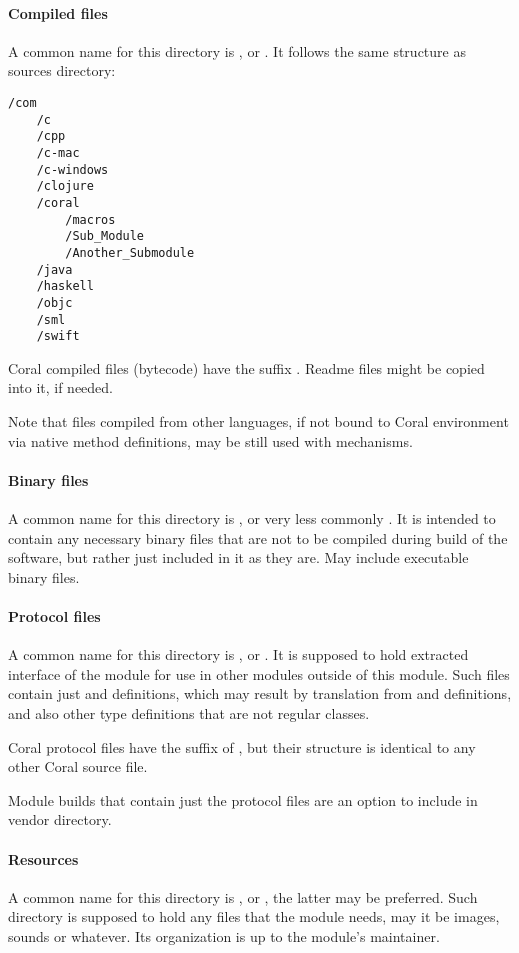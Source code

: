 \paragraph{Compiled files}
A common name for this directory is , or . It follows the same structure as sources directory:
\begin{lstlisting}
/com
    /c
    /cpp
    /c-mac
    /c-windows
    /clojure
    /coral
        /macros
        /Sub_Module
        /Another_Submodule
    /java
    /haskell
    /objc
    /sml
    /swift
\end{lstlisting}

Coral compiled files (bytecode) have the suffix . Readme files might be copied into it, if needed. 

Note that files compiled from other languages, if not bound to Coral environment via native method definitions, may be still used with  mechanisms. 

\paragraph{Binary files}
A common name for this directory is , or very less commonly . It is intended to contain any necessary binary files that are not to be compiled during build of the software, but rather just included in it as they are. May include executable binary files. 

\paragraph{Protocol files}
A common name for this directory is , or . It is supposed to hold extracted interface of the module for use in other modules outside of this module. Such files contain just  and  definitions, which may result by translation from  and  definitions, and also other type definitions that are not regular classes. 

Coral protocol files have the suffix of , but their structure is identical to any other Coral source file. 

Module builds that contain just the protocol files are an option to include in vendor directory. 

\paragraph{Resources}
A common name for this directory is , or , the latter may be preferred. Such directory is supposed to hold any files that the module needs, may it be images, sounds or whatever. Its organization is up to the module's maintainer. 

